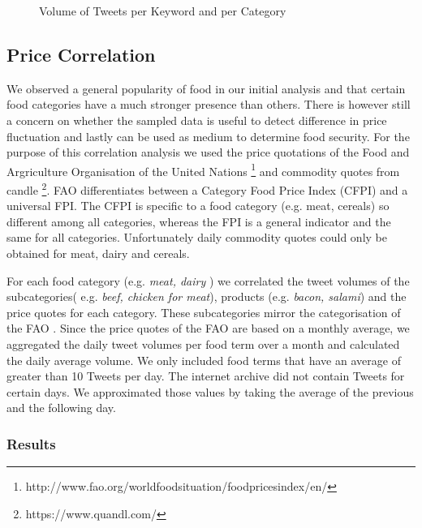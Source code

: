 \begin{figure}[H]
        \caption{Volume of Tweets per Keyword and per Category}\label{fig:distribution}
\end{figure}


\subsection{Price Correlation}
\label{corr}


We observed a general popularity of food in our initial analysis and that certain food categories have a much stronger presence than others. There is however still a concern on whether the sampled data is useful to detect difference in price fluctuation and lastly can  be used as medium to determine food security. For the purpose of this correlation analysis we used the price quotations of the Food and Argriculture Organisation of the United Nations \footnote{http://www.fao.org/worldfoodsituation/foodpricesindex/en/} and commodity quotes from candle \footnote{https://www.quandl.com/}. FAO differentiates between a Category Food Price Index (CFPI) and a universal FPI. The CFPI is specific to a food category (e.g. meat, cereals) so different among all categories, whereas the FPI is a general indicator and  the same for all categories. Unfortunately daily commodity quotes could only be obtained for meat, dairy and cereals. 

For each food category (e.g. \emph{meat, dairy} ) we correlated the tweet volumes of the subcategories( e.g. \emph{beef, chicken for meat}), products (e.g. \emph{bacon, salami}) and the price quotes for each category. These subcategories mirror the categorisation of the FAO \cite{fao2008}. Since the price quotes of the FAO are based on a monthly average, we aggregated the daily tweet volumes per food term over a month and calculated the daily average volume. We only included food terms that have an average of greater than 10 Tweets per day. The internet archive did not contain Tweets for certain days. We approximated those values by taking the average of the previous and the following day. 

\subsubsection{Results} 
\label{corr_results}

